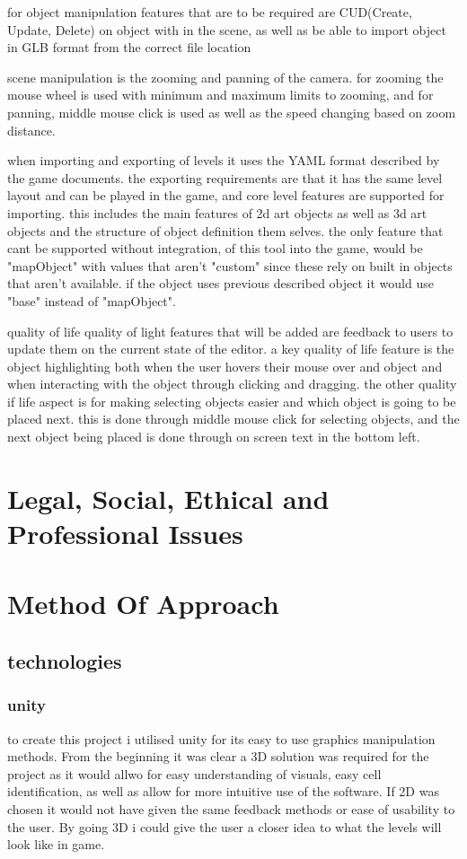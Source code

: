 for object manipulation features that are to be required are CUD(Create, Update, Delete) on object with in the scene, as well as be able to import object in GLB format from the correct file location

scene manipulation is the zooming and panning of the camera. for zooming the mouse wheel is used with minimum and maximum limits to zooming, and for panning, middle mouse click is used as well as the speed changing based on zoom distance. 

when importing and exporting of levels it uses the YAML format described by the game documents. the exporting requirements are that it has the same level layout and can be played in the game, and core level features are supported for importing. this includes the main features of 2d art objects as well as 3d art objects and the structure of object definition them selves. the only feature that cant be supported without integration, of this tool into the game, would be "mapObject" with values that aren't "custom" since these rely on built in objects that aren't available. if the object uses previous described object it would use "base" instead of "mapObject". 

quality of life
quality of light features that will be added are feedback to users to update them on the current state of the editor. a key quality of life feature is the object highlighting both when the user hovers their mouse over and object and when interacting with the object through clicking and dragging. the other quality if life aspect is for making selecting objects easier and which object is going to be placed next. this is done through middle mouse click for selecting objects, and the next object being placed is done through on screen text in the bottom left.

\section{Legal, Social, Ethical and Professional Issues}

\section{Method Of Approach}

\subsection{technologies}
\subsubsection{unity}
to create this project i utilised unity for its easy to use graphics manipulation methods. From the beginning it was clear a 3D solution was required for the project as it would allwo for easy understanding of visuals, easy cell identification, as well as allow for more intuitive use of the software. If 2D was chosen it would not have given the same feedback methods or ease of usability to the user. By going 3D i could give the user a closer idea to what the levels will look like in game.

